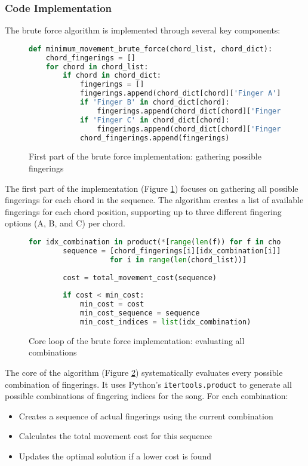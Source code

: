 \documentclass[conference]{IEEEtran}
\begin{document}
\subsubsection{Code Implementation}
The brute force algorithm is implemented through several key components:

\begin{figure}[H]
\begin{lstlisting}[language=Python]
def minimum_movement_brute_force(chord_list, chord_dict):
    chord_fingerings = []
    for chord in chord_list:
        if chord in chord_dict:
            fingerings = []
            fingerings.append(chord_dict[chord]['Finger A'])
            if 'Finger B' in chord_dict[chord]:
                fingerings.append(chord_dict[chord]['Finger B'])
            if 'Finger C' in chord_dict[chord]:
                fingerings.append(chord_dict[chord]['Finger C'])
            chord_fingerings.append(fingerings)
\end{lstlisting}
\caption{First part of the brute force implementation: gathering possible fingerings}
\label{fig:BruteForceGather}
\end{figure}

The first part of the implementation (Figure \ref{fig:BruteForceGather}) focuses on gathering all possible fingerings for each chord in the sequence. The algorithm creates a list of available fingerings for each chord position, supporting up to three different fingering options (A, B, and C) per chord. 

\begin{figure}[H]
\begin{lstlisting}[language=Python]
    for idx_combination in product(*[range(len(f)) for f in chord_fingerings]):
        sequence = [chord_fingerings[i][idx_combination[i]] 
                   for i in range(len(chord_list))]
        
        cost = total_movement_cost(sequence)
        
        if cost < min_cost:
            min_cost = cost
            min_cost_sequence = sequence
            min_cost_indices = list(idx_combination)
\end{lstlisting}
\caption{Core loop of the brute force implementation: evaluating all combinations}
\label{fig:BruteForceCore}
\end{figure}

The core of the algorithm (Figure \ref{fig:BruteForceCore}) systematically evaluates every possible combination of fingerings. It uses Python's \lstinline{itertools.product} to generate all possible combinations of fingering indices for the song. For each combination:
\begin{itemize}
    \item Creates a sequence of actual fingerings using the current combination
    \item Calculates the total movement cost for this sequence
    \item Updates the optimal solution if a lower cost is found
\end{itemize}
\end{document}
